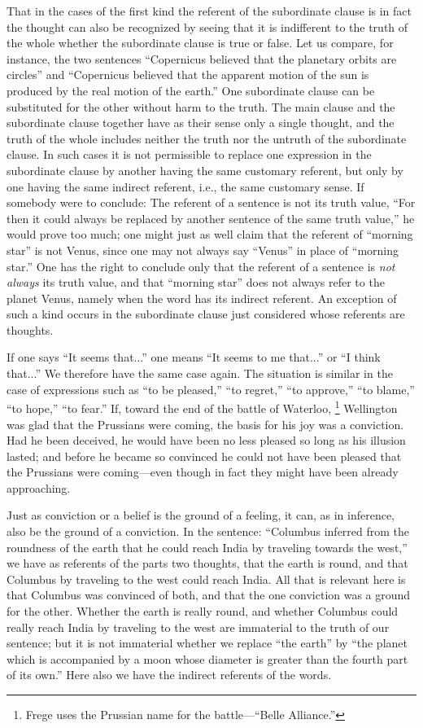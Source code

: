 \documentclass[twoside,12pt,a4paper]{article}
\newcommand{\footnoteAlph}[2][\thefootnote]{%
  \renewcommand{\thefootnote}{\Alph{footnote}}%
  \footnote[#1]{#2}%
  \renewcommand{\thefootnote}{\arabic{footnote}}}
\begin{document}
That in the cases of the first kind the referent of the subordinate
clause is in fact the thought can also be recognized by seeing that it
is indifferent to the truth of the whole whether the subordinate
clause is true or false. Let us compare, for instance, the two
sentences ``Copernicus believed that the planetary orbits are
circles'' and ``Copernicus believed that the apparent motion of the
sun is produced by the real motion of the earth.'' One subordinate
clause can be substituted for the other without harm to the truth. The
main clause and the subordinate clause together have as their sense
only a single thought, and the truth of the whole includes neither the
truth nor the untruth of the subordinate clause. In such cases it is
not permissible to replace one expression in the subordinate clause by
another having the same customary referent, but only by one having the
same indirect referent, i.e., the same customary sense. If somebody
were to conclude: The referent of a sentence is not its truth value,
``For then it could always be replaced by another sentence of the same
truth value,'' he would prove too much; one might just as well claim
that the referent of ``morning star'' is not Venus, since one may not
always say ``Venus'' in place of ``morning star.'' One has the right
to conclude only that the referent of a sentence is \emph{not always}
its truth value, and that ``morning star''  does not
always refer to the planet Venus, namely when the word has its
indirect referent. An exception of such a kind occurs in the
subordinate clause just considered whose referents are thoughts.

If one says ``It seems that...'' one means ``It seems to me that...''
or ``I think that...'' We therefore have the same case again. The
situation is similar in the case of expressions such as ``to be
pleased,'' ``to regret,'' ``to approve,'' ``to blame,'' ``to hope,''
``to fear.'' If, toward the end of the battle of
Waterloo,\footnoteAlph[5]{Frege uses the Prussian name for the
  battle---``Belle Alliance.''} Wellington was glad that the Prussians
were coming, the basis for his joy was a conviction. Had he been
deceived, he would have been no less pleased so long as his illusion
lasted; and before he became so convinced he could not have been
pleased that the Prussians were coming---even though in fact they might
have been already approaching.

Just as conviction or a belief is the ground of a feeling, it can, as
in inference, also be the ground of a conviction. In the sentence:
``Columbus inferred from the roundness of the earth that he could
reach India by traveling towards the west,'' we have as referents of
the parts two thoughts, that the earth is round, and that Columbus by
traveling to the west could reach India. All that is relevant here is
that Columbus was convinced of both, and that the one conviction was a
ground for the other. Whether the earth is really round, and whether
Columbus could really reach India by traveling to the west are
immaterial to the truth of our sentence; but it is not immaterial
whether we replace ``the earth'' by ``the planet which is accompanied
by a moon whose diameter is greater than the fourth part of its own.''
Here also we have the indirect referents of the words.
\end{document}
